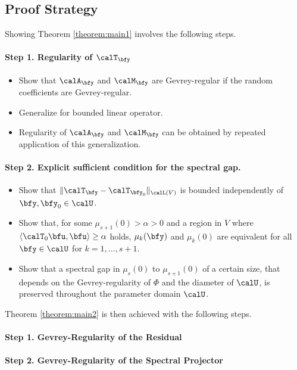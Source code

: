 \subsection{Proof Strategy}
Showing Theorem \ref{theorem:main1} involves the following steps.
\paragraph{Step 1. Regularity of $\calT_\bfy$}
\begin{itemize}
    \item Show that $\calA_\bfy$ and $\calM_\bfy$ are Gevrey-regular if the random coefficients are Gevrey-regular.
    \item Generalize \cite[Lemma 2]{chernov2026gevreyclassregularitysteadystate} for bounded linear operator.
    \item Regularity of $\calA_\bfy$ and $\calM_{\bfy}$ can be obtained by repeated application of this generalization.
\end{itemize}
\paragraph{Step 2. Explicit sufficient condition for the spectral gap.}
\begin{itemize}
    \item Show that $\| \calT_{\bfy} - \calT_{\bfy_0} \|_{\calL(V)} $ is bounded independently of $\bfy,\bfy_0 \in \calU$.
    \item Show that, for some  $\mu_{s+1}(0) > \alpha > 0$ and a region in $V$ where $\langle \calT_{0} \bfu , \bfu \rangle \geq \alpha$ holds, $\mu_k(\bfy)$ and $\mu_k(0)$ are equivalent for all $\bfy \in \calU$ for $k=1,\ldots, s+1$.
    \item Show that a spectral gap in $\mu_{s}(0)$ to $\mu_{s+1}(0)$ of a certain size, that depends on the Gevrey-regularity of $\Phi$ and the diameter of $\calU$, is preserved throughout the parameter domain $\calU$.
\end{itemize}
 Theorem \ref{theorem:main2} is then achieved with the following steps. 
\paragraph{Step 1. Gevrey-Regularity of the Residual}
\paragraph{Step 2. Gevrey-Regularity of the Spectral Projector}




